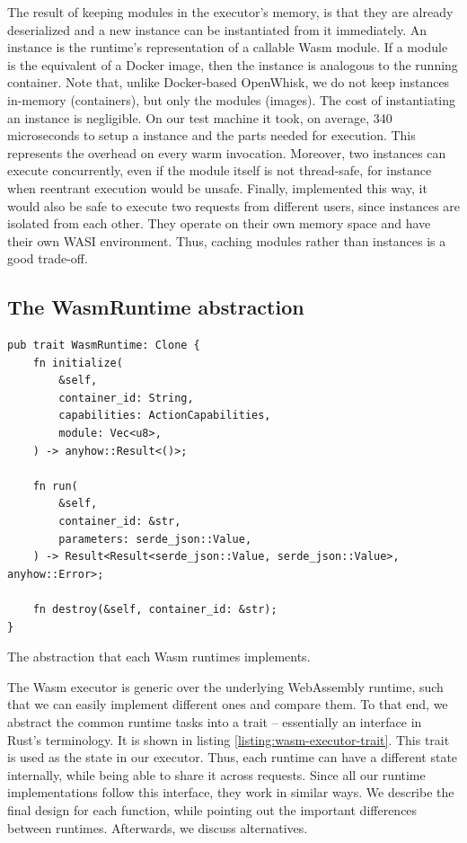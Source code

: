 The result of keeping modules in the executor's memory, is that they are already deserialized and a new instance can be instantiated from it immediately. An instance is the runtime's representation of a callable Wasm module. If a module is the equivalent of a Docker image, then the instance is analogous to the running container. Note that, unlike Docker-based OpenWhisk, we do not keep instances in-memory (containers), but only the modules (images). The cost of instantiating an instance is negligible. On our test machine it took, on average, 340 microseconds to setup a  instance and the parts needed for execution. This represents the overhead on every warm invocation. Moreover, two instances can execute concurrently, even if the module itself is not thread-safe, for instance when reentrant execution would be unsafe. Finally, implemented this way, it would also be safe to execute two requests from different users, since instances are isolated from each other. They operate on their own memory space and have their own WASI environment. Thus, caching modules rather than instances is a good trade-off.

\subsection{The WasmRuntime abstraction}

\begin{listing}[ht]
    \begin{verbatim}
pub trait WasmRuntime: Clone {
    fn initialize(
        &self,
        container_id: String,
        capabilities: ActionCapabilities,
        module: Vec<u8>,
    ) -> anyhow::Result<()>;

    fn run(
        &self,
        container_id: &str,
        parameters: serde_json::Value,
    ) -> Result<Result<serde_json::Value, serde_json::Value>, anyhow::Error>;

    fn destroy(&self, container_id: &str);
}
\end{verbatim}
    \caption{The  abstraction that each Wasm runtimes implements.}
    \label{listing:wasm-executor-trait}
\end{listing}


The Wasm executor is generic over the underlying WebAssembly runtime, such that we can easily implement different ones and compare them. To that end, we abstract the common runtime tasks into a trait -- essentially an interface in Rust's terminology. It is shown in listing \ref{listing:wasm-executor-trait}. This trait is used as the state in our executor. Thus, each runtime can have a different state internally, while being able to share it across requests. Since all our runtime implementations follow this interface, they work in similar ways. We describe the final design for each function, while pointing out the important differences between runtimes. Afterwards, we discuss alternatives.

